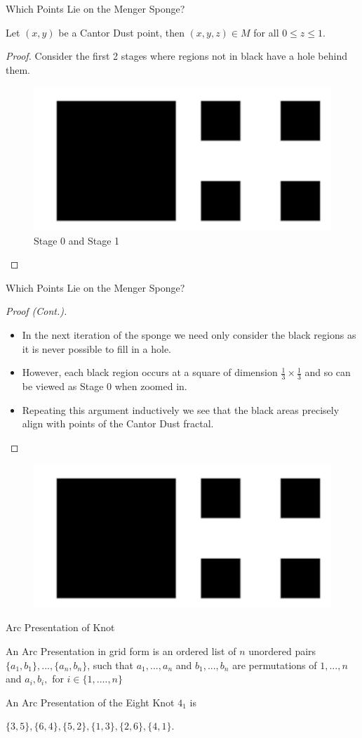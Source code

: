\begin{frame}{Which Points Lie on the Menger Sponge?}
	\begin{lemma}
		Let $ (x, y)$ be a Cantor Dust point, then $(x,y,z) \in M$ for all $0 \leq z \leq 1$.
	\end{lemma}
	
	\begin{proof}
		Consider the first 2 stages where regions not in black have a hole behind them. 
		\begin{figure}
			\centering
			\includegraphics[width=0.22\linewidth]{ProofOfPointsOnSponge.png}
			\caption{Stage 0 and Stage 1}
			\label{fig:enter-label}
		\end{figure}
	\end{proof}
\end{frame}

\begin{frame}{Which Points Lie on the Menger Sponge?}
	\begin{proof}[Proof (Cont.)]
		\begin{itemize}
			\item In the next iteration of the sponge we need only consider the black regions as it is never possible to fill in a hole. 
			\item However, each black region occurs at a square of dimension $\frac{1}{3}\times\frac{1}{3}$ and so can be viewed as Stage $0$ when zoomed in. 
			\item Repeating this argument inductively we see that the black areas precisely align with points of the Cantor Dust fractal.
		\end{itemize}
	\end{proof}
	\begin{figure}
		\centering
		\includegraphics[width=0.22\linewidth]{ProofOfPointsOnSponge.png}
	\end{figure}
\end{frame}

\begin{frame}{Arc Presentation of Knot}
	\begin{definition}
		An Arc Presentation in grid form is an ordered list of $n$ unordered pairs
		$\{a_1, b_1\}, ..., \{a_n, b_n\}$,
		such that $a_1, ..., a_n$ and $b_1, ..., b_n$ are permutations of $1, ..., n$ and
		$a_i , b_i,$ for $ i \in \{1, ...., n\}$
	\end{definition}
	
	\begin{example}
		An Arc Presentation of the Eight Knot $4_1$ is
		\begin{center}
			$\{3, 5\}, \{6, 4\}, \{5, 2\}, \{1, 3\}, \{2, 6\}, \{4, 1\}$.
		\end{center}
		
	\end{example}
\end{frame}

